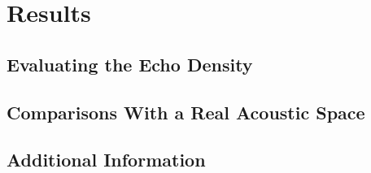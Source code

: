 \chapter{Results}
\section{Evaluating the Echo Density}
\section{Comparisons With a Real Acoustic Space}
\section{Additional Information}
